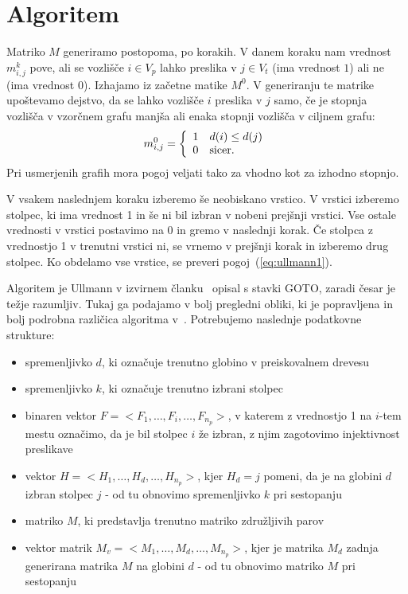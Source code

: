 \documentclass[a4paper, 12pt, ]{book}
\begin{document}
	
	\section{Algoritem}
	Matriko $M$ generiramo postopoma, po korakih. V danem koraku nam vrednost $m_{i,j}^k$ pove, ali se vozlišče $i \in V_p$ lahko preslika 
	v $j \in V_t$ (ima vrednost $1$) ali ne	(ima vrednost $0$). Izhajamo iz začetne matike $M^0$. V generiranju te matrike upoštevamo dejstvo, da
	se lahko vozlišče $i$ preslika v $j$ samo, če je stopnja vozlišča v vzorčnem grafu manjša ali enaka stopnji vozlišča v ciljnem grafu:
		\begin{equation}
		\label{eq:ullmann2}
		m_{i,j}^0 = \left\{ 
		  \begin{array}{l l}
		    1 & \text{$d(i) \leq d(j)$}\\
		    0 & \text{sicer.}
		  \end{array} \right.
		\end{equation}
	Pri usmerjenih grafih mora pogoj  veljati tako za vhodno kot za izhodno stopnjo.
	
	V vsakem naslednjem koraku izberemo še neobiskano vrstico. V vrstici izberemo stolpec, ki ima vrednost 1 in še ni bil izbran v nobeni prejšnji vrstici.
	Vse ostale vrednosti v vrstici postavimo na 0
	in gremo v naslednji korak. Če stolpca z vrednostjo 1 v trenutni vrstici ni, se vrnemo v prejšnji korak in izberemo drug stolpec. Ko obdelamo vse vrstice,
	se preveri pogoj~(\ref{eq:ullmann1}).
	
	Algoritem je Ullmann v izvirnem članku~\cite{ullmann} opisal s stavki GOTO, zaradi česar je težje razumljiv. Tukaj ga podajamo v bolj pregledni obliki,
	ki je popravljena in bolj podrobna različica algoritma v~\cite{zampelli-th}. Potrebujemo naslednje podatkovne strukture:
	\begin{itemize}
		\item spremenljivko $d$, ki označuje trenutno globino v preiskovalnem drevesu
		\item spremenljivko $k$, ki označuje trenutno izbrani stolpec
		\item binaren vektor $F = <F_1, \ldots, F_i, \ldots,  F_{n_p} > $, v katerem z vrednostjo 1 na $i$-tem mestu označimo, 
			da je bil stolpec $i$ že izbran, z njim zagotovimo injektivnost preslikave
		\item vektor $H = < H_1, \ldots, H_d, \ldots, H_{n_p} > $, kjer $H_d = j$ pomeni, da je na globini $d$ izbran stolpec $j$ - od tu 
			obnovimo spremenljivko $k$ pri sestopanju
		\item matriko $M$, ki predstavlja trenutno matriko združljivih parov
		\item vektor matrik $M_v = < M_1, \ldots, M_d, \ldots, M_{n_p} > $, kjer je matrika $M_d$ zadnja generirana matrika $M$ na globini $d$ - od
			tu obnovimo matriko $M$ pri sestopanju
	\end{itemize}
\end{document}
